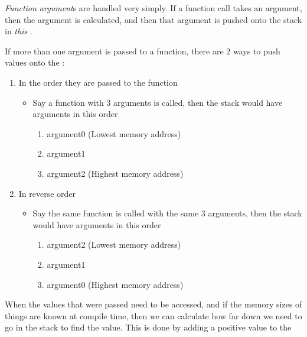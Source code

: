 \begin{definition}\label{def:Function_Argument}
  \emph{Function argument}s are handled very simply.
  If a function call takes an argument, then the argument is calculated, and then that argument is pushed onto the stack in \emph{this} .

  \begin{remark}
    If more than one argument is passed to a function, there are 2 ways to push values onto the :
    \begin{enumerate}[noitemsep]
    \item In the order they are passed to the function
      \begin{itemize}[noitemsep]
      \item Say a function with 3 arguments is called, then the stack would have arguments in this order
        \begin{enumerate}[noitemsep]
        \item argument0 (Lowest memory address)
        \item argument1
        \item argument2 (Highest memory address)
        \end{enumerate}
      \end{itemize}
    \item In reverse order
      \begin{itemize}[noitemsep]
      \item Say the same function is called with the same 3 arguments, then the stack would have arguments in this order
        \begin{enumerate}[noitemsep]
        \item argument2 (Lowest memory address)
        \item argument1
        \item argument0 (Highest memory address)
        \end{enumerate}
      \end{itemize}
    \end{enumerate}
  \end{remark}

  When the values that were passed need to be accessed, and if the memory sizes of things are known at compile time, then we can calculate how far down we need to go in the stack to find the value.
  This is done by adding a positive value to the \rbpRegister{}
\end{definition}

